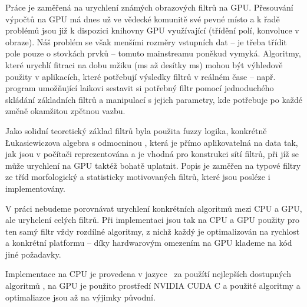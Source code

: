 


Práce je zaměřená na urychlení známých obrazových filtrů na GPU. Přesouvání výpočtů na GPU má dnes už ve vědecké komunitě své pevné místo a k řadě problémů jsou již k dispozici knihovny GPU využívající (třídění polí, konvoluce v obraze). Náš problém se však menšími rozměry vstupních dat -- je třeba třídit pole pouze o stovkách prvků -- tomuto mainstreamu poněkud vymyká. Algoritmy, které urychlí fitraci na dobu mžiku (ms až desítky ms) mohou být výhledově použity v aplikacích, které potřebují výsledky filtrů v reálném čase -- např. program umožňující laikovi sestavit si potřebný filtr pomocí jednoduchého skládání základních filtrů a manipulací s jejich parametry, kde potřebuje po každé změně okamžitou zpětnou vazbu. 

Jako solidní teoretický základ filtrů byla použita fuzzy logika, konkrétně \L ukasiewiczova algebra s odmocninou \cite{MajerovaPhD}, která je přímo aplikovatelná na data tak, jak jsou v počítači reprezentována a je vhodná pro konstrukci sítí filtrů, při jíž se může urychlení na GPU taktéž bohatě uplatnit.
Popis je zaměřen na typové filtry ze tříd morfologický a statisticky motivovaných filtrů, které jsou posléze i implementovány.

V práci nebudeme porovnávat urychlení konkrétních algoritmů mezi CPU a GPU, ale uryhclení celých filtrů. Při implementaci jsou tak na CPU a GPU použity pro ten samý filtr vždy rozdílné algoritmy, z nichž každý je optimalizován na rychlost a konkrétní platformu -- díky hardwarovým omezením na GPU klademe na kód jiné požadavky.

Implementace na CPU je provedena v jazyce \Cpp ~za použítí nejlepších dostupných algoritmů \cite{Numerical Recipes}, na GPU je použito prostředí NVIDIA CUDA C a použité algoritmy a optimaliazce jsou až na výjimky původní.